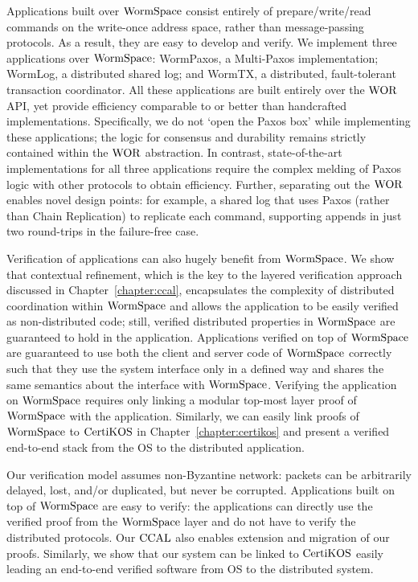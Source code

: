 Applications built over $\mathrm{WormSpace}$ consist entirely of prepare/write/read commands on the write-once address space, rather than message-passing protocols. As a result, they are easy to develop and verify. We implement three applications over $\mathrm{WormSpace}$: WormPaxos, a Multi-Paxos implementation; WormLog, a distributed shared log; and WormTX, a distributed, fault-tolerant transaction coordinator. All these applications are built entirely over the $\mathrm{WOR}$ API, yet provide efficiency comparable to or better than handcrafted implementations. Specifically, we do not `open the Paxos box' while implementing these applications; the logic for consensus and durability remains strictly contained within the $\mathrm{WOR}$ abstraction. In contrast, state-of-the-art implementations for all three applications require the complex melding of Paxos logic with other protocols to obtain efficiency. Further, separating out the $\mathrm{WOR}$ enables novel design points: for example, a shared log that uses Paxos (rather than Chain Replication) to replicate each command, supporting appends in just two round-trips in the failure-free case.

Verification of applications can also hugely benefit from $\mathrm{WormSpace}$. We show that contextual refinement, which is the key to the layered verification approach discussed in Chapter~\ref{chapter:ccal}, encapsulates the complexity of distributed coordination within $\mathrm{WormSpace}$ and allows the application to be easily verified as non-distributed code; still, verified distributed properties in $\mathrm{WormSpace}$ are guaranteed to hold in the application. Applications verified on top of $\mathrm{WormSpace}$ are guaranteed to use both the client and server code of $\mathrm{WormSpace}$ correctly such that they use the system interface only in a defined way and shares the same semantics about the interface with $\mathrm{WormSpace}$. Verifying the application on $\mathrm{WormSpace}$ requires only linking a modular top-most layer proof of $\mathrm{WormSpace}$ with the application. Similarly, we can easily link  proofs of $\mathrm{WormSpace}$ to $\mathrm{CertiKOS}$ in Chapter~\ref{chapter:certikos} and present a verified end-to-end stack from the OS to the distributed application.

Our verification model assumes non-Byzantine network: packets can be arbitrarily delayed, lost, and/or duplicated, but never be corrupted. Applications built on top of $\mathrm{WormSpace}$ are easy to verify: the applications can directly use the verified proof from the $\mathrm{WormSpace}$ layer and do not have to verify the distributed protocols. Our $\mathrm{CCAL}$ also enables extension and migration of our proofs. Similarly, we show that our system can be linked to $\mathrm{CertiKOS}$ easily leading an end-to-end verified software from OS to the distributed system.



